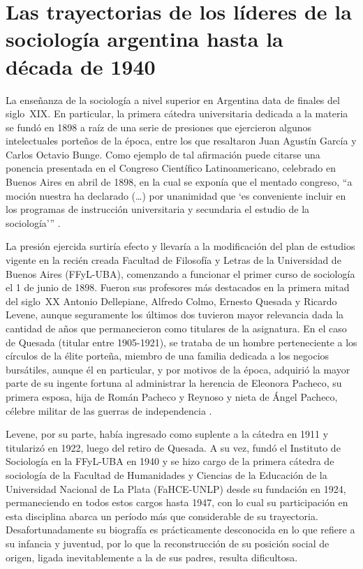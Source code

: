 \section{Las trayectorias de los líderes de la sociología argentina hasta la década de 1940}

La enseñanza de la sociología a nivel superior en Argentina data de finales del siglo~XIX. En particular, la primera cátedra universitaria dedicada a la materia se fundó en 1898 a raíz de una serie de presiones que ejercieron algunos intelectuales porteños de la época, entre los que resaltaron Juan Agustín García y Carlos Octavio Bunge. Como ejemplo de tal afirmación puede citarse una ponencia presentada en el Congreso Científico Latinoamericano, celebrado en Buenos Aires en abril de 1898, en la cual se exponía que el mentado congreso, \enquote{a moción nuestra  ha declarado (\dots) por unanimidad que \enquote{es conveniente incluir en los programas de instrucción universitaria y secundaria el estudio de la sociología}} \parencite[80]{1445-BUNGE1898}.

La presión ejercida surtiría efecto y llevaría a la modificación del plan de estudios vigente en la recién creada Facultad de Filosofía y Letras de la Universidad de Buenos Aires (FFyL-UBA), comenzando a funcionar el primer curso de sociología el 1 de junio de 1898. Fueron sus profesores más destacados en la primera mitad del siglo~XX Antonio Dellepiane, Alfredo Colmo, Ernesto Quesada y Ricardo Levene, aunque seguramente los últimos dos tuvieron mayor relevancia dada la cantidad de años que permanecieron como titulares de la asignatura. En el caso de Quesada (titular entre 1905-1921), se trataba de un hombre perteneciente a los círculos de la élite porteña, miembro de una familia dedicada a los negocios bursátiles, aunque él en particular, y por motivos de la época, adquirió la mayor parte de su ingente fortuna al administrar la herencia de Eleonora Pacheco, su primera esposa, hija de Román Pacheco y Reynoso y nieta de Ángel Pacheco, célebre militar de las guerras de independencia \parencite{1535-BUCHBINDER2012}.

Levene, por su parte, había ingresado como suplente a la cátedra en 1911 y titularizó en 1922, luego del retiro de Quesada. A su vez, fundó el Instituto de Sociología en la FFyL-UBA en 1940 y se hizo cargo de la primera cátedra de sociología de la Facultad de Humanidades y Ciencias de la Educación de la Universidad Nacional de La Plata (FaHCE-UNLP) desde su fundación en 1924, permaneciendo en todos estos cargos hasta 1947, con lo cual su participación en esta disciplina abarca un período más que considerable de su trayectoria. Desafortunadamente su biografía es prácticamente desconocida en lo que refiere a su infancia y juventud, por lo que la reconstrucción de su posición social de origen, ligada inevitablemente a la de sus padres, resulta dificultosa.

